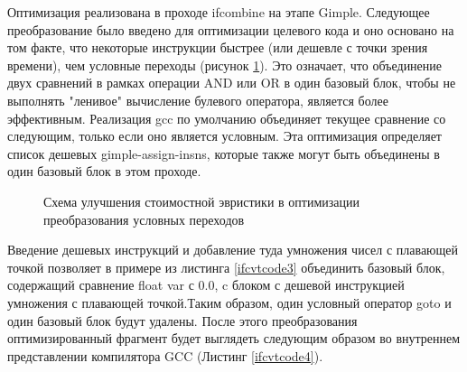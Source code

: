 
Оптимизация реализована в проходе ifcombine на этапе  Gimple. Следующее преобразование было введено для оптимизации целевого кода  и оно основано на том факте, что некоторые инструкции быстрее (или дешевле с точки зрения времени), чем условные переходы (рисунок \ref{ifcvt2svg1}). Это означает, что объединение двух сравнений в рамках операции AND или OR в один базовый блок, чтобы не выполнять "ленивое"\phantom{} вычисление булевого оператора, является более эффективным. Реализация gcc по умолчанию объединяет текущее сравнение со следующим, только если оно является условным. Эта оптимизация определяет список дешевых gimple-assign-insns, которые также могут быть объединены в один базовый блок в этом проходе.

\begin{figure}[htbp]
	\centering
	
	\caption{Схема улучшения стоимостной эвристики в оптимизации преобразования условных переходов}
	\label{ifcvt2svg1}
\end{figure}

Введение дешевых инструкций и добавление туда умножения чисел с плавающей точкой позволяет в примере из листинга \ref{ifcvtcode3} объединить  базовый блок, содержащий сравнение float var с 0.0, c блоком с дешевой инструкцией умножения с плавающей точкой.Таким образом, один условный оператор goto и один базовый блок будут удалены. После этого преобразования оптимизированный фрагмент будет выглядеть следующим образом во внутреннем представлении компилятора GCC (Листинг \ref{ifcvtcode4}).

